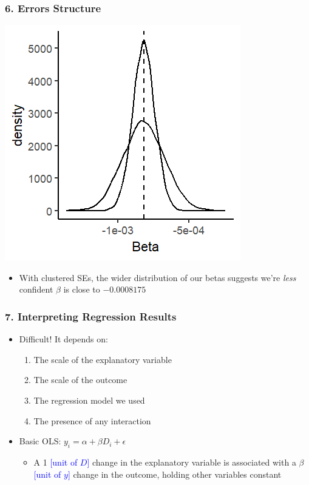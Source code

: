 \documentclass[xcolor=x11names,compress]{beamer}\usepackage[]{graphicx}\usepackage[]{color}
\makeatletter
\def\maxwidth{ %
  \ifdim\Gin@nat@width>\linewidth
    \linewidth
  \else
    \Gin@nat@width
  \fi
}
\newenvironment{knitrout}{}{} %
\renewcommand{\(}{\begin{columns}}
\renewcommand{\)}{\end{columns}}
\newcommand{\<}[1]{\begin{column}{#1}}
\renewcommand{\>}{\end{column}}
\makeatother
\begin{document}
\begin{frame}
\frametitle{6. Errors Structure}
\begin{multicols}{2}
\begin{knitrout}
\color{fgcolor}
\includegraphics[width=\maxwidth]{figure/beta_dist_errors_5-1} 

\end{knitrout}
\columnbreak
\begin{itemize}
\item With clustered SEs, the wider distribution of our betas suggests we're \textit{less} confident $\beta$ is close to $-0.0008175$
\end{itemize}
\end{multicols}
\end{frame}

\begin{frame}
\frametitle{7. Interpreting Regression Results}
\begin{itemize}
\item Difficult! It depends on:
\begin{enumerate}
\item The scale of the explanatory variable
\item The scale of the outcome
\item The regression model we used
\item The presence of any interaction
\end{enumerate}
\item Basic OLS: $y_i = \alpha + \beta D_i + \epsilon$
\begin{itemize}
\item A 1 \textcolor{blue}{[unit of $D$]} change in the explanatory variable is associated with a $\beta$ \textcolor{blue}{[unit of $y$]} change in the outcome, holding other variables constant
\end{itemize}
\end{itemize}
\end{frame}
\end{document}
